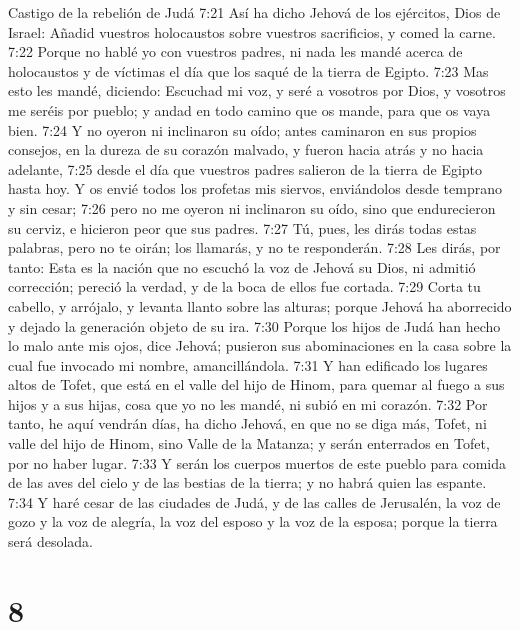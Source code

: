 Castigo de la rebelión de Judá  
7:21 Así ha dicho Jehová de los ejércitos, Dios de Israel: Añadid vuestros holocaustos sobre vuestros sacrificios, y comed la carne.  
7:22 Porque no hablé yo con vuestros padres, ni nada les mandé acerca de holocaustos y de víctimas el día que los saqué de la tierra de Egipto.  
7:23 Mas esto les mandé, diciendo: Escuchad mi voz, y seré a vosotros por Dios, y vosotros me seréis por pueblo; y andad en todo camino que os mande, para que os vaya bien.  
7:24 Y no oyeron ni inclinaron su oído; antes caminaron en sus propios consejos, en la dureza de su corazón malvado, y fueron hacia atrás y no hacia adelante,  
7:25 desde el día que vuestros padres salieron de la tierra de Egipto hasta hoy. Y os envié todos los profetas mis siervos, enviándolos desde temprano y sin cesar;  
7:26 pero no me oyeron ni inclinaron su oído, sino que endurecieron su cerviz, e hicieron peor que sus padres.  
7:27 Tú, pues, les dirás todas estas palabras, pero no te oirán; los llamarás, y no te responderán.  
7:28 Les dirás, por tanto: Esta es la nación que no escuchó la voz de Jehová su Dios, ni admitió corrección; pereció la verdad, y de la boca de ellos fue cortada.  
7:29 Corta tu cabello, y arrójalo, y levanta llanto sobre las alturas; porque Jehová ha aborrecido y dejado la generación objeto de su ira.  
7:30 Porque los hijos de Judá han hecho lo malo ante mis ojos, dice Jehová; pusieron sus abominaciones en la casa sobre la cual fue invocado mi nombre, amancillándola.  
7:31 Y han edificado los lugares altos de Tofet, que está en el valle del hijo de Hinom,  para quemar al fuego a sus hijos y a sus hijas, cosa que yo no les mandé, ni subió en mi corazón.  
7:32 Por tanto, he aquí vendrán días, ha dicho Jehová, en que no se diga más, Tofet, ni valle del hijo de Hinom, sino Valle de la Matanza; y serán enterrados en Tofet, por no haber lugar.  
7:33 Y serán los cuerpos muertos de este pueblo para comida de las aves del cielo y de las bestias de la tierra; y no habrá quien las espante.  
7:34 Y haré cesar de las ciudades de Judá, y de las calles de Jerusalén, la voz de gozo y la voz de alegría, la voz del esposo y la voz de la esposa; porque la tierra será desolada.  

\chapter{8}

